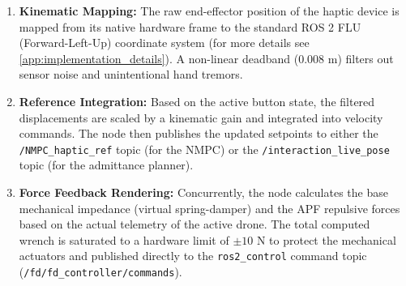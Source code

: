 \begin{enumerate}
    \item \textbf{Kinematic Mapping:} The raw end-effector position of the haptic device is mapped from its native hardware frame to the standard ROS 2 FLU (Forward-Left-Up) coordinate system (for more details see \ref{app:implementation_details}). A non-linear deadband ($0.008\text{ m}$) filters out sensor noise and unintentional hand tremors.
    \item \textbf{Reference Integration:} Based on the active button state, the filtered displacements are scaled by a kinematic gain and integrated into velocity commands. The node then publishes the updated setpoints to either the \texttt{/NMPC\_haptic\_ref} topic (for the NMPC) or the \texttt{/interaction\_live\_pose} topic (for the admittance planner).
    \item \textbf{Force Feedback Rendering:} Concurrently, the node calculates the base mechanical impedance (virtual spring-damper) and the APF repulsive forces based on the actual telemetry of the active drone. The total computed wrench is saturated to a hardware limit of $\pm 10\text{ N}$ to protect the mechanical actuators and published directly to the \texttt{ros2\_control} command topic (\texttt{/fd/fd\_controller/commands}).

\begin{figure}[h!]
    \centering
\end{figure}
\end{enumerate}
